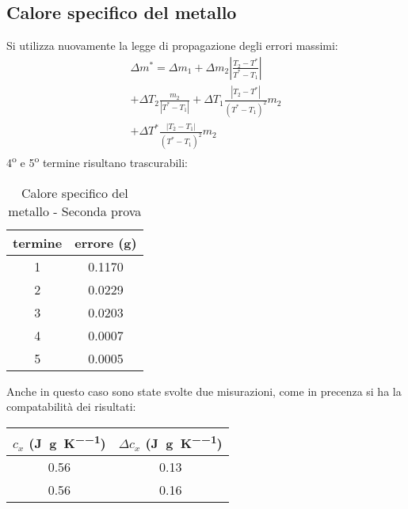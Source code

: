 \documentclass[10pt,twocolumn]{article}
\begin{document}
\subsection{Calore specifico del metallo}
Si utilizza nuovamente la legge di propagazione degli errori massimi:
\begin{multline*}
\Delta m^* = \Delta m_1 + \Delta m_2 \left| \frac{T_2 - T^*}{T^* - T_1} \right| \\
+ \Delta T_2 \frac{m_2}{|T^* - T_1|} 
+ \Delta T_1 \frac{|T_2 - T^*|}{(T^* - T_1)^2} m_2 \\
+ \Delta T^* \frac{|T_2 - T_1|}{(T^* - T_1)^2} m_2
\end{multline*}
4\textsuperscript{o} e 5\textsuperscript{o} termine risultano trascurabili:
    \begin{table}[H]
        \centering
		\begin{tabular}{|c|c|}
		\hline
		 termine & errore (g)  \\ \hline
		1  & 0.1170 \\ \hline
        2  & 0.0229 \\ \hline
        3  & 0.0203\\ \hline
        4  & 0.0007 \\ \hline
        5  & 0.0005 \\ \hline
		\end{tabular}
        \caption*{Calore specifico del metallo - Seconda prova}
	\end{table}
Anche in questo caso sono state svolte due misurazioni, come in precenza si ha la compatabilità dei risultati:
  \begin{table}[H]
    \centering
		\begin{tabular}{|c|c|}
		\hline
        $c_x$ (\si{\joule\per\gram\per\kelvin}) & $\Delta c_x$ (\si{\joule\per\gram\per\kelvin}) \\ \hline
		0.56 & 0.13 \\ \hline
        0.56 & 0.16 \\ \hline
		\end{tabular}
	\end{table}

    \begin{center}
        
    \end{center}
\end{document}
